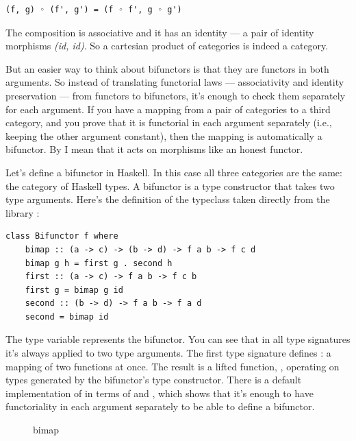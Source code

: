 \begin{Verbatim}[commandchars=\\\{\}]
(f, g) ◦ (f', g') = (f ◦ f', g ◦ g')
\end{Verbatim}
The composition is associative and it has an identity --- a pair of
identity morphisms \emph{(id, id)}. So a cartesian product of categories
is indeed a category.

But an easier way to think about bifunctors is that they are functors in
both arguments. So instead of translating functorial laws ---
associativity and identity preservation --- from functors to bifunctors,
it's enough to check them separately for each argument. If you have a
mapping from a pair of categories to a third category, and you prove
that it is functorial in each argument separately (i.e., keeping the
other argument constant), then the mapping is automatically a bifunctor.
By  I mean that it acts on morphisms like an honest
functor.

Let's define a bifunctor in Haskell. In this case all three categories
are the same: the category of Haskell types. A bifunctor is a type
constructor that takes two type arguments. Here's the definition of the
 typeclass taken directly from the library
:

\begin{Verbatim}[commandchars=\\\{\}]
class Bifunctor f where 
    bimap :: (a -> c) -> (b -> d) -> f a b -> f c d
    bimap g h = first g . second h
    first :: (a -> c) -> f a b -> f c b
    first g = bimap g id
    second :: (b -> d) -> f a b -> f a d
    second = bimap id
\end{Verbatim}
The type variable  represents the bifunctor. You can see that
in all type signatures it's always applied to two type arguments. The
first type signature defines : a mapping of two functions
at once. The result is a lifted function,
, operating on types
generated by the bifunctor's type constructor. There is a default
implementation of  in terms of  and
, which shows that it's enough to have functoriality in
each argument separately to be able to define a bifunctor.

\begin{figure}[H]
\centering
{}
\caption{bimap}
\end{figure}


